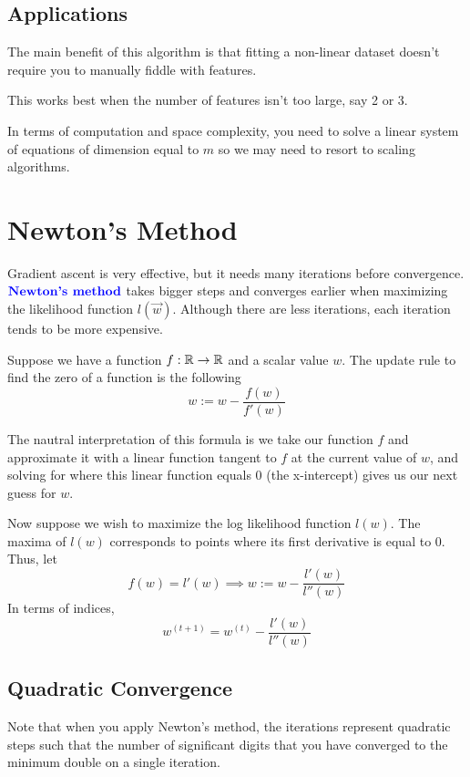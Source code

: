 \documentclass[12pt]{scrartcl}
\begin{document}
\subsection{Applications}

The main benefit of this algorithm is that fitting a non-linear dataset doesn't
require you to manually fiddle with features.

\begin{note}
    This works best when the number of features isn't too large, say 2 or 3.
\end{note}

In terms of computation and space complexity, you need to solve a linear system
of equations of dimension equal to $m$ so we may need to resort to scaling
algorithms.

\section{Newton's Method}

\begin{definition}
    Gradient ascent is very effective, but it needs many iterations before
    convergence. $\textbf{\color{blue} Newton's method}$ takes bigger steps
    and converges earlier when maximizing the likelihood function
    $l(\vec{w})$. Although there are less iterations, each
    iteration tends to be more expensive.
\end{definition}

\begin{lemma}
    Suppose we have a function $f: \mathbb R \to \mathbb R$
    and a scalar value $w$. The update rule
    to find the zero of a function is the following
    \[w := w - \frac{f(w)}{f'(w)}\]

    The nautral interpretation of this formula is we take our function $f$ and
    approximate it with a linear function tangent to $f$ at the current value of
    $w$, and solving for where this linear function equals 0 (the x-intercept)
    gives us our next guess for $w$.
\end{lemma}

Now suppose we wish to maximize the log likelihood function $l(w)$. The maxima
of $l(w)$ corresponds to points where its first derivative is equal to 0. Thus,
let
\[f(w) = l'(w) \implies w := w - \frac{l'(w)}{l''(w)}\]
In terms of indices,
\[w^{(t+1)} = w^{(t)} - \frac{l'(w)}{l''(w)}\]

\subsection{Quadratic Convergence}
Note that when you apply Newton's method, the iterations represent quadratic
steps such that the number of significant digits that you have converged to the
minimum double on a single iteration.
\end{document}
